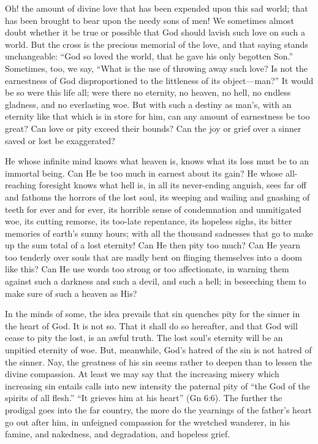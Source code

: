 \documentclass[
]{book}
\begin{document}
Oh! the amount of divine love that has been expended upon this sad world; that has been brought to bear upon the needy sons of men! We sometimes almost doubt whether it be true or possible that God should lavish such love on such a world. But the cross is the precious memorial of the love, and that saying stands unchangeable: ``God so loved the world, that he gave his only begotten Son.'' Sometimes, too, we say, ``What is the use of throwing away such love? Is not the earnestness of God disproportioned to the littleness of its object---man?'' It would be so were this life all; were there no eternity, no heaven, no hell, no endless gladness, and no everlasting woe. But with such a destiny as man's, with an eternity like that which is in store for him, can any amount of earnestness be too great? Can love or pity exceed their bounds? Can the joy or grief over a sinner saved or lost be exaggerated?

He whose infinite mind knows what heaven is, knows what its loss must be to an immortal being. Can He be too much in earnest about its gain? He whose all-reaching foresight knows what hell is, in all its never-ending anguish, sees far off and fathoms the horrors of the lost soul, its weeping and wailing and gnashing of teeth for ever and for ever, its horrible sense of condemnation and unmitigated woe, its cutting remorse, its too-late repentance, its hopeless sighs, its bitter memories of earth's sunny hours; with all the thousand sadnesses that go to make up the sum total of a lost eternity! Can He then pity too much? Can He yearn too tenderly over souls that are madly bent on flinging themselves into a doom like this? Can He use words too strong or too affectionate, in warning them against such a darkness and such a devil, and such a hell; in beseeching them to make sure of such a heaven as His?

In the minds of some, the idea prevails that sin quenches pity for the sinner in the heart of God. It is not so. That it shall do so hereafter, and that God will cease to pity the lost, is an awful truth. The lost soul's eternity will be an unpitied eternity of woe. But, meanwhile, God's hatred of the sin is not hatred of the sinner. Nay, the greatness of his sin seems rather to deepen than to lessen the divine compassion. At least we may say that the increasing misery which increasing sin entails calls into new intensity the paternal pity of ``the God of the spirits of all flesh.'' ``It grieves him at his heart'' (Gn 6:6). The further the prodigal goes into the far country, the more do the yearnings of the father's heart go out after him, in unfeigned compassion for the wretched wanderer, in his famine, and nakedness, and degradation, and hopeless grief.
\end{document}
